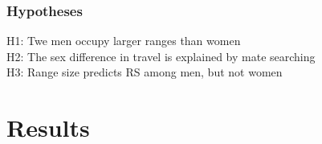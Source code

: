 \documentclass{beamer}
\begin{document}

\begin{frame}

\frametitle{Hypotheses}

H1: Twe men occupy larger ranges than women \\
\vspace{0.75cm}
H2: The sex difference in travel is explained by mate searching \\
\vspace{0.75cm}
H3: Range size predicts RS among men, but not women \\

\end{frame}


\section{Results}

\end{document}
